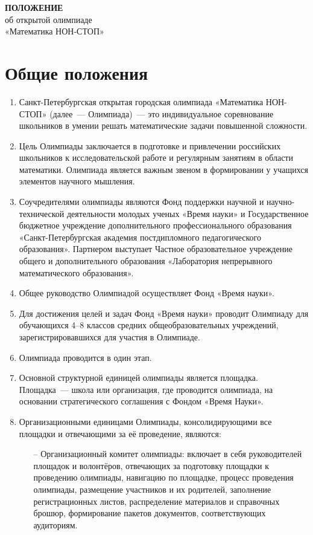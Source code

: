 \documentclass[a4paper,12pt]{article}
\newcommand{\mns}{«Математика НОН-СТОП»\xspace}
\begin{document}


\begin{center} \Large
	{\bf ПОЛОЖЕНИЕ} \\
	об открытой олимпиаде \\
	\mns \\
\end{center}

\section{Общие положения}

\begin{enumerate}
	\item Санкт-Петербургская открытая городская олимпиада «Математика НОН-СТОП» (далее~— Олимпиада)~— это индивидуальное соревнование школьников в умении решать математические задачи повышенной сложности.
	\item Цель Олимпиады заключается в подготовке и привлечении российских школьников к исследовательской работе и регулярным занятиям в области математики. Олимпиада является важным звеном в формировании у учащихся элементов научного мышления.
	\item Соучредителями олимпиады являются Фонд поддержки научной и научно-технической деятельности молодых ученых «Время науки» и Государственное бюджетное учреждение дополнительного профессионального образования «Санкт-Петербургская академия постдипломного педагогического образования». Партнером выступает Частное образовательное учреждение общего и дополнительного образования «Лаборатория непрерывного математического образования».
	\item Общее руководство Олимпиадой осуществляет Фонд «Время науки». 
	\item Для достижения целей и задач Фонд «Время науки» проводит Олимпиаду для обучающихся 4–8 классов средних общеобразовательных учреждений, зарегистрировавшихся для участия в Олимпиаде.
	\item Олимпиада проводится в один этап.
	\item Основной структурной единицей олимпиады является площадка. Площадка~— школа или организация, где проводится олимпиада, на основании стратегического соглашения с Фондом «Время Науки».
	\item Организационными единицами Олимпиады, консолидирующими все площадки и отвечающими за её проведение, являются: \begin{enumerate}
	   \item[–] Организационный комитет олимпиады: включает в себя руководителей площадок и волонтёров, отвечающих за подготовку площадки к проведению олимпиады, навигацию по площадке, процесс проведения олимпиады, размещение участников и их родителей, заполнение регистрационных листов, распределение материалов и справочных брошюр, формирование пакетов документов, соответствующих аудиториям.

\end{enumerate}
\end{enumerate}
\end{document}
